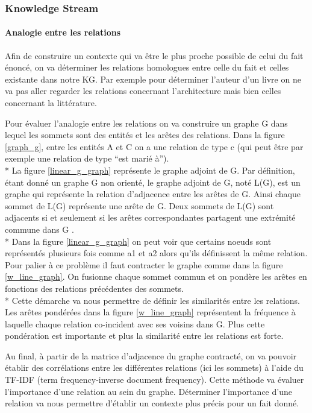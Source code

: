 \subsubsection{Knowledge Stream}
\label{sec:ks}

\paragraph{Analogie entre les relations}

Afin de construire un contexte qui va être le plus proche possible de celui du fait énoncé, on va déterminer les relations homologues entre celle du fait et celles existante dans notre KG. Par exemple pour déterminer l'auteur d'un livre on ne va pas aller regarder les relations concernant l'architecture mais bien celles concernant la littérature.

Pour évaluer l'analogie entre les relations on va construire un graphe G dans lequel les sommets sont des entités et les arêtes des relations. Dans la figure \ref{graph_g},  entre les entités A et C on a une relation de type c (qui peut être par exemple une relation de type \enquote{est marié à}).
\\*
La figure \ref{linear_g_graph} représente le graphe adjoint de G. Par définition, étant donné un graphe G non orienté, le graphe adjoint de G, noté L(G), est un graphe qui représente la relation d'adjacence entre les arêtes de G. Ainsi chaque sommet de L(G) représente une arête de G. Deux sommets de L(G) sont adjacents si et seulement si les arêtes correspondantes partagent une extrémité commune dans G \cite{wiki:lg}.
\\* 
Dans la figure \ref{linear_g_graph} on peut voir que certains noeuds sont représentés plusieurs fois comme a1 et a2 alors qu'ils définissent la même relation. Pour palier à ce problème il faut contracter le graphe comme dans la figure \ref{w_line_graph}. On fusionne chaque sommet commun et on pondère les arêtes en fonctions des relations précédentes des sommets.
\\*
Cette démarche va nous permettre de définir les similarités entre les relations. Les arêtes pondérées dans la figure \ref{w_line_graph} représentent la fréquence à laquelle chaque relation co-incident avec ses voisins dans G. Plus cette pondération est importante et plus la similarité entre les relations est forte.

Au final, à partir de la matrice d'adjacence du graphe contracté, on va pouvoir établir des corrélations entre les différentes relations (ici les sommets) à l'aide du TF-IDF (term frequency-inverse document frequency). Cette méthode va évaluer l'importance d'une relation au sein du graphe. Déterminer l'importance d'une relation va nous permettre d'établir un contexte plus précis pour un fait donné. 

